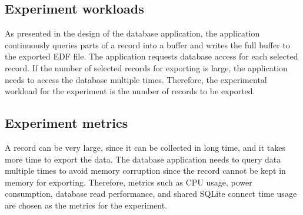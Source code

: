 \subsection{Experiment workloads}
As presented in the design of the database application, the application continuously queries parts of a record into a buffer and writes the full buffer to the exported EDF file. The application requests database access for each selected record. If the number of selected records for exporting is large, the application needs to access the database multiple times. Therefore, the experimental workload for the experiment is the number of records to be exported.
\subsection{Experiment metrics}
A record can be very large, since it can be collected in long time, and it takes more time to export the data. The database application needs to query data multiple times to avoid memory corruption since the record cannot be kept in memory for exporting. Therefore, metrics such as CPU usage, power consumption, database read performance, and shared SQLite connect time usage are chosen as the metrics for the experiment.
